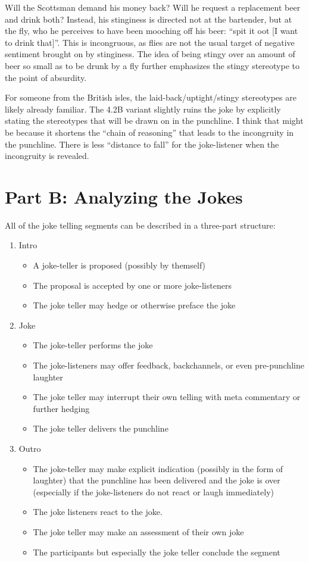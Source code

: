 \documentclass[a4]{scrartcl}
\begin{document}
Will the Scottsman demand his money back?
Will he request a replacement beer and drink both?
Instead, his stinginess is directed not at the bartender,
but at the fly, who he perceives to have been mooching off his beer:
``spit it oot [I want to drink that]''.
This is incongruous, as flies are not the usual target of negative sentiment
brought on by stinginess.
The idea of being stingy over an amount of beer so small as to be drunk by a fly
further emphasizes the stingy stereotype to the point of absurdity.

For someone from the British isles, the laid-back/uptight/stingy 
stereotypes are likely already familiar. 
The 4.2B variant slightly ruins the joke by explicitly stating the 
stereotypes that will be drawn on in the punchline.
I think that might be because it shortens the ``chain of reasoning''
that leads to the incongruity in the punchline.
There is less ``distance to fall'' for the joke-listener when the incongruity is revealed.


\section{Part B: Analyzing the Jokes}

All of the joke telling segments can be described in a three-part structure:
\begin{enumerate}
  \item Intro
    \begin{itemize}
      \item A joke-teller is proposed (possibly by themself)
      \item The proposal is accepted by one or more joke-listeners
      \item The joke teller may hedge or otherwise preface the joke
    \end{itemize}
  \item Joke 
    \begin{itemize}
      \item The joke-teller performs the joke
      \item The joke-listeners may offer feedback, backchannels, or even pre-punchline laughter
      \item The joke teller may interrupt their own telling with meta commentary or further hedging
      \item The joke teller delivers the punchline
    \end{itemize}
  \item Outro
  \begin{itemize}
      \item The joke-teller may make explicit indication (possibly in the form of laughter) that the punchline
            has been delivered and the joke is over (especially if the joke-listeners do not react or laugh immediately)
      \item The joke listeners react to the joke. 
      \item The joke teller may make an assessment of their own joke
      \item The participants but especially the joke teller conclude the segment 
  \end{itemize}
\end{enumerate}
\end{document}
